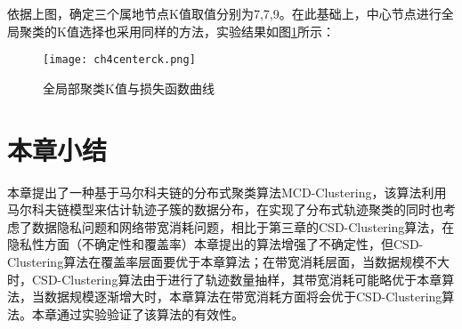 依据上图，确定三个属地节点K值取值分别为7,7,9。在此基础上，中心节点进行全局聚类的K值选择也采用同样的方法，实验结果如图\ref{ch4centerck}所示：
\begin{figure}[H]
	\texttt{[image: ch4centerck.png]}
	\caption{全局部聚类K值与损失函数曲线}
	\label{ch4centerck}
\end{figure}









\section{本章小结}

本章提出了一种基于马尔科夫链的分布式聚类算法MCD-Clustering，该算法利用马尔科夫链模型来估计轨迹子簇的数据分布，在实现了分布式轨迹聚类的同时也考虑了数据隐私问题和网络带宽消耗问题，相比于第三章的CSD-Clustering算法，在隐私性方面（不确定性和覆盖率）本章提出的算法增强了不确定性，但CSD-Clustering算法在覆盖率层面要优于本章算法；在带宽消耗层面，当数据规模不大时，CSD-Clustering算法由于进行了轨迹数量抽样，其带宽消耗可能略优于本章算法，当数据规模逐渐增大时，本章算法在带宽消耗方面将会优于CSD-Clustering算法。本章通过实验验证了该算法的有效性。
